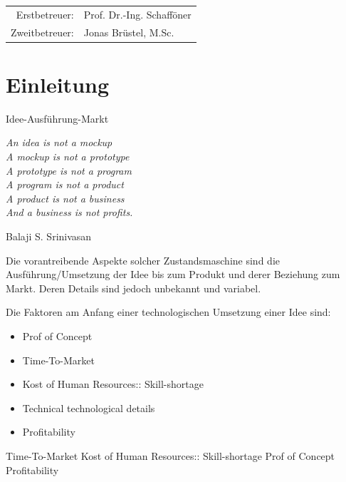 \documentclass[
12pt,
english,
ngerman,
headsepline,
twoside,
openright,
numbers=noenddot,version=first
]{scrreprt}
\providecommand{\tabularnewline}{\\}
\let\myTOC\tableofcontents
\renewcommand\tableofcontents{
    \begin{spacing}{1.1}
    \myTOC
    \end{spacing}
    \clearpage
    \pagenumbering{arabic}
}
\begin{document}
\vspace{1cm}

\noindent \begin{center}
\medskip{}
\begin{tabular}{rl}
Erstbetreuer: & Prof. Dr.-Ing. Schafföner\tabularnewline
Zweitbetreuer: & Jonas Brüstel, M.Sc.\tabularnewline
\end{tabular}
\par\end{center}

\noindent \begin{center}
{\huge }
\par\end{center}{\huge \par}

\newpage{}

%
\tableofcontents{}

\pagestyle{scrheadings}   


\chapter{Einleitung}{Idee-Ausführung-Markt}
\setcounter{page}{1}
\label{chap:introduction}
\epigraph{\textit{\textquotedbl{}
		An idea is not a mockup\\
		A mockup is not a prototype\\
		A prototype is not a program\\
		A program is not a product\\
		A product is not a business\\
		And a business is not profits.\textquotedbl{}}}{
	Balaji S. Srinivasan }


Die vorantreibende Aspekte solcher Zustandsmaschine sind die Ausführung/Umsetzung der Idee bis zum Produkt und derer Beziehung zum Markt. Deren Details sind jedoch unbekannt und variabel. 

Die Faktoren am Anfang einer technologischen Umsetzung einer Idee sind: 
\begin{itemize}
	\item Prof of Concept
	\item Time-To-Market
	\item Kost of Human Resources:: Skill-shortage
	\item Technical technological details	
	\item Profitability
\end{itemize}

Time-To-Market
Kost of Human Resources:: Skill-shortage
Prof of Concept
Profitability
\end{document}
